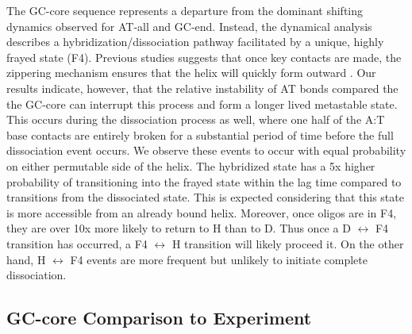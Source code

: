 \documentclass[journal=jpcbfk,manuscript=article]{achemso}
\begin{document}
The GC-core sequence represents a departure from the dominant shifting dynamics observed for AT-all and GC-end. Instead, the dynamical analysis describes a hybridization/dissociation pathway facilitated by a unique, highly frayed state (F4). Previous studies suggests that once key contacts are made, the zippering mechanism ensures that the helix will quickly form outward \citep{Romano2013DNADependence, Yin2011KineticsHybridization}. Our results indicate, however, that the relative instability of AT bonds compared the the GC-core can interrupt this process and form a longer lived metastable state. This occurs during the dissociation process as well, where one half of the A:T base contacts are entirely broken for a substantial period of time before the full dissociation event occurs. We observe these events to occur with equal probability on either permutable side of the helix. The hybridized state has a 5x higher probability of transitioning into the frayed state within the lag time compared to transitions from the dissociated state. This is expected considering that this state is more accessible from an already bound helix. Moreover, once oligos are in F4, they are over 10x more likely to return to H than to D. Thus once a D $\leftrightarrow$ F4 transition has occurred, a F4 $\leftrightarrow$ H transition will likely proceed it. On the other hand, H $\leftrightarrow$ F4 events are more frequent but unlikely to initiate complete dissociation.

\subsection{GC-core Comparison to Experiment}
\end{document}
